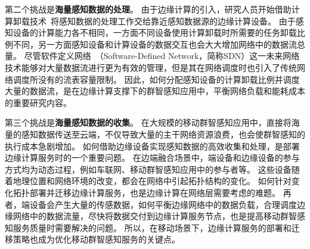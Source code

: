 第二个挑战是\textbf{海量感知数据的处理}。
由于边缘计算的引入，研究人员开始借助计算卸载技术~\cite{DBLP:journals/network/MaZZWP13}将感知数据的处理工作交给靠近感知数据源的边缘计算设备。
由于感知设备的计算能力各不相同，一方面不同设备使用计算卸载时所需要的任务卸载比例不同，另一方面感知设备和计算设备的数据交互也会大大增加网络中的数据流总量。
尽管软件定义网络~（Software-Defined Network，简称SDN）这一未来网络技术能够对大量数据流进行更为有效的管理，但是其在网络调度时也引入了传统网络调度所没有的流表容量限制。
因此，如何分配感知设备的计算卸载比例并调度大量的数据流，是在边缘计算支撑下的群智感知应用中，平衡网络负载和能耗成本的重要研究内容。


第三个挑战是\textbf{海量感知数据的收集}。
在大规模的移动群智感知应用中，直接将海量的感知数据传送至云端，不仅导致大量的主干网络资源浪费，也会使群智感知的执行成本急剧增加。
如何借助边缘设备实现感知数据的高效收集和处理，是部署边缘计算服务时的一个重要问题。
在边端融合场景中，端设备和边缘设备的参与方式均为动态过程，例如车联网、移动群智感知应用中的参与者等。
这些设备随着地理位置和网络环境的改变，都会在网络中引起拓扑结构的变化。
如何针对变化拓扑部署并迁移边缘计算服务，也是边缘计算在网络层需要考虑的难题。
再者，端设备会产生大量的传感数据，如何平衡边缘网络中的数据负载，合理调度边缘网络中的数据流量，尽快将数据交付到边缘计算服务节点，也是提高移动群智感知服务质量时需要解决的问题。
所以，在移动场景下，边缘计算服务的部署和迁移策略也成为优化移动群智感知服务的关键点。



